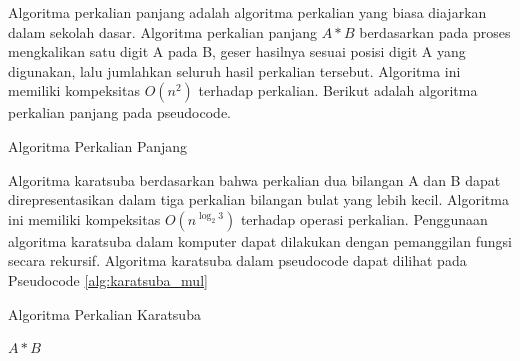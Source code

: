 Algoritma perkalian panjang adalah algoritma perkalian yang biasa diajarkan dalam sekolah dasar. Algoritma perkalian panjang $A*B$ berdasarkan pada proses mengkalikan satu digit A pada B, geser hasilnya sesuai posisi digit A yang digunakan, lalu jumlahkan seluruh hasil perkalian tersebut. Algoritma ini memiliki kompeksitas $O(n^2)$ terhadap perkalian. Berikut adalah algoritma perkalian panjang pada pseudocode.

\begin{algorithm}
  \caption{Algoritma Perkalian Panjang}
    \label{alg:mul}
  \begin{algorithmic}[1]
    \Statex
        \EndFor
      \EndFor
      \State {}
    \EndFunction
  \end{algorithmic}
\end{algorithm}

Algoritma karatsuba berdasarkan bahwa perkalian dua bilangan A dan B dapat direpresentasikan dalam tiga perkalian bilangan bulat yang lebih kecil. Algoritma ini memiliki kompeksitas $O(n^{\log_2 3})$ terhadap operasi perkalian. Penggunaan algoritma karatsuba dalam komputer dapat dilakukan dengan pemanggilan fungsi secara rekursif. Algoritma karatsuba dalam pseudocode dapat dilihat pada Pseudocode \ref{alg:karatsuba_mul}

\begin{algorithm}
  \caption{Algoritma Perkalian Karatsuba}
  \label{alg:karatsuba_mul}
  \begin{algorithmic}
    \Statex
        \State \Return $A * B$
      \EndIf
      \State

      \State {}
    \EndFunction
  \end{algorithmic}
\end{algorithm}


